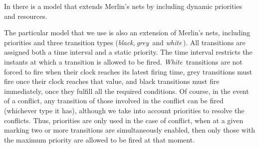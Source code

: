 In \cite{Buc03} there is a model that
extends Merlin's nets by including dynamic priorities and resources.

The particular model that we use is also an extension of Merlin's
nets, 
including priorities and three transition types ({\em black,\,grey\,} and
{\em white\,}). All transitions are assigned both a time interval
and a static priority. The time interval restricts the instants at
which a transition is allowed to be fired. {\em White}\, transitions
are not forced to fire when their clock reaches its latest firing
time, grey transitions must fire once their clock reaches that value, 
and black  transitions
must fire immediately, once they fulfill all the required conditions. 
Of course, in the
event of a conflict, any transition of those involved in the conflict 
can be fired (whichever type it has), although we take into account 
priorities to resolve the conflicts. Thus, priorities are only
used in the case of conflict, when at a given marking two or more
transitions are simultaneously enabled, then only those with 
the maximum priority are allowed to be fired at that moment.

